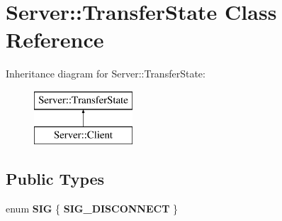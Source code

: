 \hypertarget{classServer_1_1TransferState}{}\section{Server\+:\+:Transfer\+State Class Reference}
\label{classServer_1_1TransferState}
Inheritance diagram for Server\+:\+:Transfer\+State\+:\begin{figure}[H]
\begin{center}
\leavevmode
\includegraphics[height=2.000000cm]{db/dc2/classServer_1_1TransferState}
\end{center}
\end{figure}
\subsection*{Public Types}
\begin{DoxyCompactItemize}
\item 
\mbox{\label{classServer_1_1TransferState_ad3674155e8c5292c7a6d8ba7587f43e1}} 
enum {\bfseries S\+IG} \{ {\bfseries S\+I\+G\+\_\+\+D\+I\+S\+C\+O\+N\+N\+E\+CT}
 \}
\end{DoxyCompactItemize}
